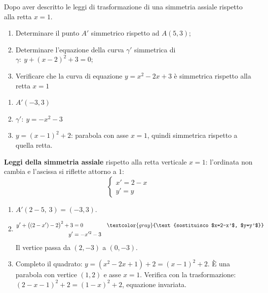 
\begin{question}[ID=1.2, subtitle={Simmetria assiale rispetto alla retta $x=1$}, tags={trasformazioni, simmetria}, difficulty=facile]
Dopo aver descritto le leggi di trasformazione di una simmetria assiale rispetto alla retta $x=1$.
\begin{enumerate}
\item Determinare il punto $A'$ simmetrico rispetto ad $A(5,3)$;
\item Determinare l'equazione della curva $\gamma'$ simmetrica di $\gamma: \ y+(x-2)^2 + 3 = 0$;
\item Verificare che la curva di equazione $y=x^2-2x+3$ è simmetrica rispetto alla retta $x=1$
\end{enumerate}
\begin{solution}
\begin{enumerate}
    \item $A'(-3,3)$
    \item $\gamma':\ y=-x^2-3$
    \item $y=(x-1)^2+2$: parabola con asse $x=1$, quindi simmetrica rispetto a quella retta.
\end{enumerate}
\end{solution}
\begin{explanation}
\textbf{Leggi della simmetria assiale} rispetto alla retta verticale $x=1$: l'ordinata non cambia e l'ascissa si riflette attorno a $1$:
\[ \begin{cases} x'=2-x\\ y'=y\end{cases} \]
\begin{enumerate}
    \item $A'(2-5,\ 3)=(-3,3)$.
    \item \[\begin{aligned}
    y'+\big((2-x')-2\big)^2+3 &= 0 && \textcolor{gray}{\text{sostituisco $x=2-x'$, $y=y'$}}\\
    y' &= -x'^2-3
    \end{aligned}\]
    Il vertice passa da $(2,-3)$ a $(0,-3)$.
    \item Completo il quadrato: $y=(x^2-2x+1)+2=(x-1)^2+2$. È una parabola con vertice $(1,2)$ e asse $x=1$. Verifica con la trasformazione: $(2-x-1)^2+2=(1-x)^2+2$, equazione invariata.
\end{enumerate}
\end{explanation}
\end{question}


